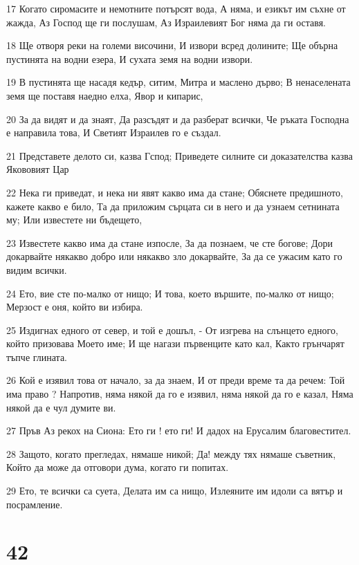 \par 17 Когато сиромасите и немотните потърсят вода, А няма, и езикът им съхне от жажда, Аз Господ ще ги послушам, Аз Израилевият Бог няма да ги оставя.
\par 18 Ще отворя реки на големи височини, И извори всред долините; Ще обърна пустинята на водни езера, И сухата земя на водни извори.
\par 19 В пустинята ще насадя кедър, ситим, Митра и маслено дърво; В ненаселената земя ще поставя наедно елха, Явор и кипарис,
\par 20 За да видят и да знаят, Да разсъдят и да разберат всички, Че ръката Господна е направила това, И Светият Израилев го е създал.
\par 21 Представете делото си, казва Гспод; Приведете силните си доказателства казва Якововият Цар
\par 22 Нека ги приведат, и нека ни явят какво има да стане; Обяснете предишното, кажете какво е било, Та да приложим сърцата си в него и да узнаем сетнината му; Или известете ни бъдещето,
\par 23 Известете какво има да стане изпосле, За да познаем, че сте богове; Дори докарвайте някакво добро или някакво зло докарвайте, За да се ужасим като го видим всички.
\par 24 Ето, вие сте по-малко от нищо; И това, което вършите, по-малко от нищо; Мерзост е оня, който ви избира.
\par 25 Издигнах едного от север, и той е дошъл, - От изгрева на слънцето едного, който призовава Моето име; И ще нагази първенците като кал, Както грънчарят тъпче глината.
\par 26 Кой е изявил това от начало, за да знаем, И от преди време та да речем: Той има право ? Напротив, няма някой да го е изявил, няма някой да го е казал, Няма някой да е чул думите ви.
\par 27 Пръв Аз рекох на Сиона: Ето ги ! ето ги! И дадох на Ерусалим благовестител.
\par 28 Защото, когато прегледах, нямаше никой; Да! между тях нямаше съветник, Който да може да отговори дума, когато ги попитах.
\par 29 Ето, те всички са суета, Делата им са нищо, Излеяните им идоли са вятър и посрамление.

\chapter{42}

